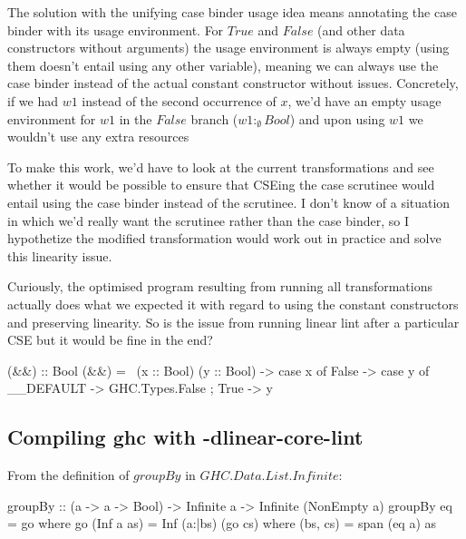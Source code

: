 \documentclass[]{lwnovathesis}
\begin{document}
The solution with the unifying case binder usage idea means annotating the case
binder with its usage environment. For $True$ and $False$ (and other data
constructors without arguments) the usage environment is always empty (using
them doesn't entail using any other variable), meaning we can always use the
case binder instead of the actual constant constructor without issues.
%
Concretely, if we had $w1$ instead of the second occurrence of $x$, we'd have
an empty usage environment for $w1$ in the $False$ branch ($w1 :_\emptyset
Bool$) and upon using $w1$ we wouldn't use any extra resources


To make this work, we'd have to look at the current transformations and see
whether it would be possible to ensure that CSEing the case scrutinee would
entail using the case binder instead of the scrutinee. I don't know of a
situation in which we'd really want the scrutinee rather than the case binder,
so I hypothetize the modified transformation would work out in practice and
solve this linearity issue.



Curiously, the optimised program resulting from running all transformations
actually does what we expected it with regard to using the constant constructors
and preserving linearity. So is the issue from running linear lint after a
particular CSE but it would be fine in the end?
\begin{code}
(&&) :: Bool %
(&&) = \ (x :: Bool) (y :: Bool) ->
  case x of {
    False -> case y of { __DEFAULT -> GHC.Types.False };
    True -> y
  }
\end{code}

\subsection{Compiling ghc with -dlinear-core-lint}

From the definition of $\mathit{groupBy}$ in $\mathit{GHC.Data.List.Infinite}$:

\begin{code}
groupBy :: (a -> a -> Bool) -> Infinite a -> Infinite (NonEmpty a)
groupBy eq = go
  where
    go (Inf a as) = Inf (a:|bs) (go cs)
      where (bs, cs) = span (eq a) as
\end{code}
\end{document}
